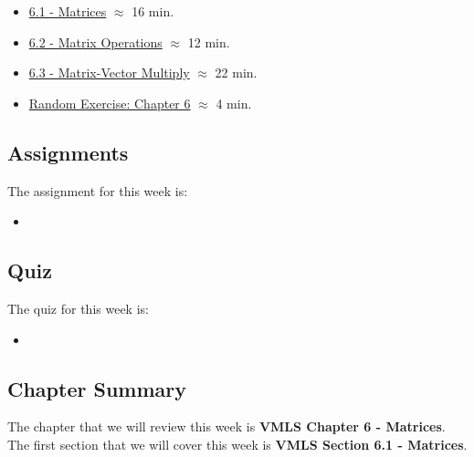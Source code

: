 \begin{itemize}
    \item \href{https://applied.cs.colorado.edu/mod/hvp/view.php?id=50733}{6.1 - Matrices} $\approx$ 16 min.
    \item \href{https://applied.cs.colorado.edu/mod/hvp/view.php?id=50734}{6.2 - Matrix Operations} $\approx$ 12 min.
    \item \href{https://applied.cs.colorado.edu/mod/hvp/view.php?id=50735}{6.3 - Matrix-Vector Multiply} $\approx$ 22 min.
    \item \href{https://applied.cs.colorado.edu/mod/hvp/view.php?id=50736}{Random Exercise: Chapter 6} $\approx$ 4 min.
\end{itemize}

\subsection{Assignments}

The assignment for this week is:

\begin{itemize}
    \item {}
\end{itemize}

\subsection{Quiz}

The quiz for this week is:

\begin{itemize}
    \item {}
\end{itemize}

\subsection{Chapter Summary}

The chapter that we will review this week is \textbf{VMLS Chapter 6 - Matrices}. The first section that we will cover this week is \textbf{VMLS Section 6.1 - Matrices}.


